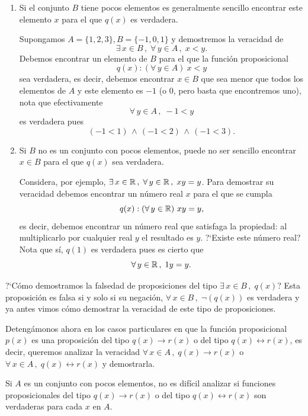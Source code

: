 \begin{enumerate}
	\item Si el conjunto $B$ tiene pocos elementos es generalmente sencillo
		encontrar este elemento $x$ para el que $q(x)$ es verdadera.
		
		Supongamos $A = \{1,2,3\}, B = \{-1,0,1\}$ y demostremos la veracidad de
		\[
			\exists\,x \in B\, ,\; \forall\, y \in A\, ,\; x < y.
		\]
		Debemos encontrar un elemento de $B$ para el que
		la funci\'on proposicional
		$$q(x): (\forall\, y \in A)\ x < y$$ sea verdadera, es decir,
		debemos encontrar $x \in B$ que sea menor que todos los
		elementos de $A$ y este elemento es $-1$ (o $0$, pero
		basta que encontremos uno), nota que efectivamente
		\[
			\forall\,y\in A\, ,\; -1 < y
		\]
		es verdadera pues
		\[
			(-1 < 1)\,\wedge\,(-1 < 2)\,\wedge\,(-1 < 3).
		\]
		
	\item Si $B$ no es un conjunto con pocos elementos, puede no
		ser sencillo encontrar $x \in B$ para el que 
		$q(x)$ sea verdadera.
		
		Considera, por ejemplo, 
		$\exists\, x \in \mathbb{R}\, ,\; \forall\, y\in
		\mathbb{R}\, ,\; xy = y$. Para demostrar su veracidad
		debemos encontrar un n\'umero real $x$ para el que se cumpla
		\[
			q(x): (\forall\, y \in \mathbb{R})\ xy = y,
		\]
		es decir, debemos encontrar un n\'umero real que satisfaga la 
		propiedad: al multiplicarlo por cualquier real $y$ el resultado
		es $y$. ?`Existe este n\'umero real? Nota que s\'i, 
		$q(1)$ es verdadera pues es cierto que 
		\[
			\forall\,y\in \mathbb{R}\, ,\; 1y = y.
		\]		 
\end{enumerate}

?`C\'omo demostramos la falsedad de proposiciones
del tipo $\exists\, x \in B\, ,\; q(x)$?
Esta proposici\'on es falsa si y solo si su negaci\'on,
$\forall\, x \in B\, ,\; 
\neg(q(x))$ es verdadera
y ya antes vimos c\'omo demostrar la veracidad de
este tipo de proposiciones. 

Deteng\'amonos ahora en los casos particulares
en que la funci\'on proposicional $p(x)$
es una proposici\'on del tipo $q(x) \rightarrow r(x)$
o del tipo $q(x) \leftrightarrow r(x)$,
es decir, queremos analizar la veracidad
$\forall\, x \in A\, ,\; q(x)\rightarrow r(x)$
o $\forall\, x \in A\, ,\; q(x) \leftrightarrow r(x)$
y demostrarla.

Si $A$ es un conjunto con pocos elementos, no
es dif\'icil analizar si funciones proposicionales
del tipo $q(x) \rightarrow r(x)$
o del tipo $q(x) \leftrightarrow r(x)$ son verdaderas para
cada $x$ en $A$. 

